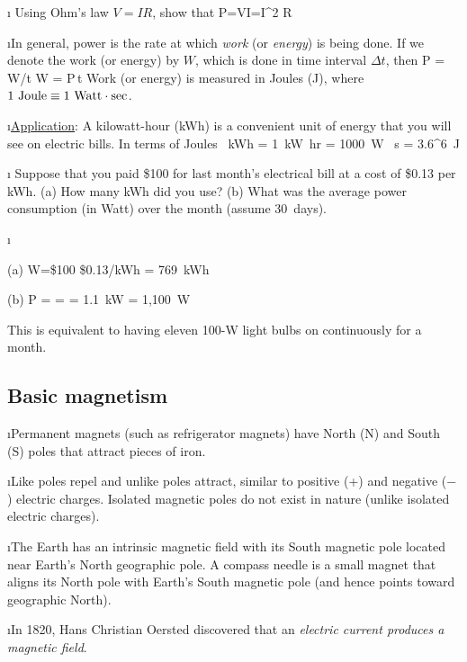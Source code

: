 \i \exer
Using Ohm's law $V=IR$, show that
%
\be
P=VI=I^2 R 
\ee

\i In general, power is the rate at which {\em work} (or {\em energy})
is  being done. 
If we denote the work (or energy) by $W$, which is done in 
time interval $\Delta t$, then
%
\be
P = W/\Delta t
\quad
W = P\,\Delta t
\ee
%
Work (or energy) is measured in Joules (J), where 
$1~{\rm Joule} \equiv 1~{\rm Watt}\cdot{\rm sec}$.

\i \underline{Application}: 
A kilowatt-hour (kWh) is a convenient unit of 
energy that you will see on electric bills.
In terms of Joules
%
~{\rm kWh}
= 1~{\rm kW}~{\rm hr}
= 1000~{\rm W} ~{\rm s}
= 3.6^6~{\rm J}
\ee

\i \exer 
Suppose that you paid \$100 for last month's electrical bill
at a cost of \$0.13 per kWh.
(a) How many kWh did you use? 
(b) What was the average power consumption (in Watt) over 
the month (assume 30~days).

\i \ans

(a) 
\be 
W=\$100 \div \$0.13/{\rm kWh} = 769~{\rm kWh}
\ee 

(b)
\be
P =  
=  
= 1.1~{\rm kW} 
= 1,100~{\rm W}
\ee

This is equivalent to having eleven 100-W light bulbs 
on continuously for a month.
 
\ei

%
\subsection{Basic magnetism}

\bi

\i Permanent magnets (such as refrigerator magnets) have 
North (N) and South (S) poles that attract pieces of iron.

\i Like poles repel and unlike poles attract,
similar to positive (+) and negative ($-$) electric charges.
Isolated magnetic poles do not exist in nature (unlike isolated
electric charges).

\i The Earth has an intrinsic magnetic field with its South 
magnetic pole located near Earth's North geographic pole.
A compass needle is a small magnet that aligns its North pole
with Earth's South magnetic pole (and hence points toward geographic
North).

\i In 1820, Hans Christian Oersted discovered that an {\em electric 
current produces a magnetic field}.

